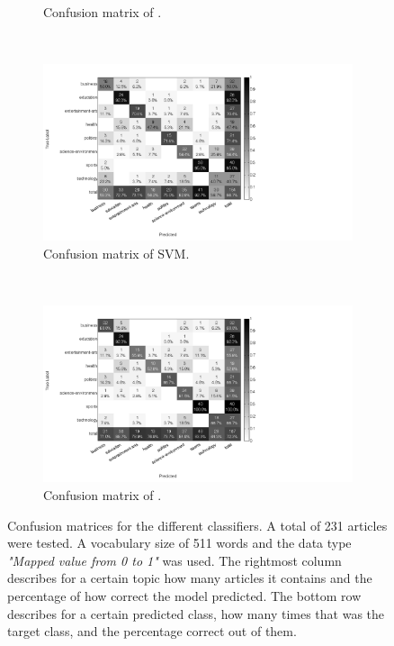 \begin{figure}[H]
\begin{subfigure}[b]{\figwidth}
		\caption{Confusion matrix of \rf.}
		\label{fig:confmat-rf}
	\end{subfigure}
	~
	\begin{subfigure}[b]{\figwidth}
		\includegraphics[width=\textwidth,trim=0 0 350 0, clip]{img/SVM_percentile_5_count.png}
		\caption{Confusion matrix of SVM.}
		\label{fig:confmat-svm}
	\end{subfigure}
	\\
	\begin{subfigure}[b]{\figwidth}
		\includegraphics[width=\textwidth,trim=0 0 350 0, clip]{img/hybrid_percentile_5_count.png}
		\caption{Confusion matrix of \hy.}
		\label{fig:confmat-hybrid}
	\end{subfigure}
	\caption{Confusion matrices for the different classifiers. A total of 231 articles were tested. A vocabulary size of 511 words and the data type \emph{"Mapped value from 0 to 1"} was used. The rightmost column describes for a certain topic how many articles it contains and the percentage of how correct the model predicted. The bottom row describes for a certain predicted class, how many times that was the target class, and the percentage correct out of them.}
	\label{fig:confmat}
\end{figure}
